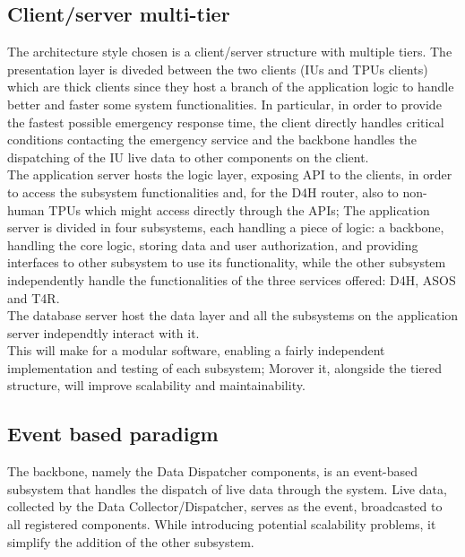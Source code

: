 \subsection{Client/server multi-tier}
The architecture style chosen is a client/server structure with multiple tiers. The presentation layer is diveded between the two clients (IUs and TPUs clients) which are thick clients since they host a branch of the application logic to handle better and faster some system functionalities. In particular, in order to provide the fastest possible emergency response time, the client directly handles critical conditions contacting the emergency service and the backbone handles the dispatching of the IU live data to other components on the client. \\
The application server hosts the logic layer, exposing API to the clients, in order to access the subsystem functionalities and, for the D4H router, also to non-human TPUs which might access directly through the APIs; The application server is divided in four subsystems, each handling a piece of logic: a backbone, handling the core logic, storing data and user authorization, and providing interfaces to other subsystem to use its functionality, while the other subsystem independently handle the functionalities of the three services offered: D4H, ASOS and T4R. \\
The database server host the data layer and all the subsystems on the application server independtly interact with it.
\\
This will make for a modular software, enabling a fairly independent implementation and testing of each subsystem; Morover it, alongside the tiered structure, will improve scalability and maintainability.

\subsection{Event based paradigm}
The backbone, namely the Data Dispatcher components, is an event-based subsystem that handles the dispatch of live data through the system. Live data, collected by the Data Collector/Dispatcher, serves as the event, broadcasted to all registered components. While introducing potential scalability problems, it simplify the addition of the other subsystem.

